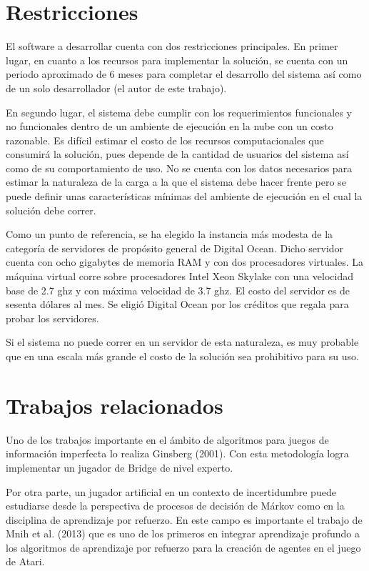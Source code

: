 \section{Restricciones}

El software a desarrollar cuenta con dos restricciones principales. En primer
lugar, en cuanto a los recursos para implementar la solución, se cuenta con un
periodo aproximado de 6 meses para completar el desarrollo del sistema así como
de un solo desarrollador (el autor de este trabajo).

En segundo lugar, el sistema debe cumplir con los requerimientos funcionales y
no funcionales dentro de un ambiente de ejecución en la nube con un costo
razonable. Es difícil estimar el costo de los recursos computacionales que
consumirá la solución, pues depende de la cantidad de usuarios del sistema así
como de su comportamiento de uso. No se cuenta con los datos necesarios para
estimar la naturaleza de la carga a la que el sistema debe hacer frente pero se
puede definir unas características mínimas del ambiente de ejecución en el cual
la solución debe correr.

Como un punto de referencia, se ha elegido la instancia más modesta de la
categoría de servidores de propósito general de Digital Ocean. Dicho servidor
cuenta con ocho gigabytes de memoria RAM y con dos procesadores virtuales. La
máquina virtual corre sobre procesadores Intel Xeon Skylake con una velocidad
base de 2.7 ghz y con máxima velocidad de 3.7 ghz. El costo del servidor es de
sesenta dólares al mes. Se eligió Digital Ocean por los créditos que regala para
probar los servidores.

Si el sistema no puede correr en un servidor de esta naturaleza, es muy probable
que en una escala más grande el costo de la solución sea prohibitivo para su
uso.

\section{Trabajos relacionados}

Uno de los trabajos importante en el ámbito de algoritmos  para juegos de
información imperfecta lo realiza Ginsberg  (2001).  Con esta metodología logra
implementar un jugador de Bridge de nivel experto.

Por otra parte, un jugador artificial en un contexto de incertidumbre puede
estudiarse desde la perspectiva de procesos de decisión de Márkov como en la
disciplina de aprendizaje por refuerzo. En este campo es importante el trabajo
de Mnih et al. (2013) que es uno de los primeros en integrar aprendizaje
profundo a los algoritmos de aprendizaje por refuerzo para la creación de
agentes en el juego de Atari.


